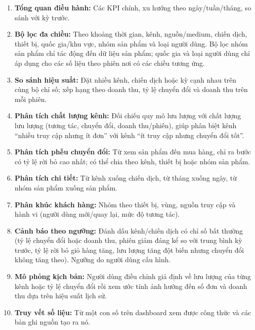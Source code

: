 \begin{enumerate}
    \item \textbf{Tổng quan điều hành:} Các KPI chính, xu hướng theo ngày/tuần/tháng, so sánh với kỳ trước.

    \item \textbf{Bộ lọc đa chiều:} Theo khoảng thời gian, kênh, nguồn/medium, chiến dịch, thiết bị, quốc gia/khu vực, nhóm sản phẩm và loại người dùng. Bộ lọc nhóm sản phẩm chỉ tác động đến dữ liệu sản phẩm; quốc gia và loại người dùng chỉ áp dụng cho các số liệu theo phiên nơi có các chiều tương ứng.

    \item \textbf{So sánh hiệu suất:} Đặt nhiều kênh, chiến dịch hoặc kỳ cạnh nhau trên cùng bộ chỉ số; xếp hạng theo doanh thu, tỷ lệ chuyển đổi và doanh thu trên mỗi phiên.

    \item \textbf{Phân tích chất lượng kênh:} Đối chiếu quy mô lưu lượng với chất lượng lưu lượng (tương tác, chuyển đổi, doanh thu/phiên), giúp phân biệt kênh ``nhiều truy cập nhưng ít đơn'' với kênh ``ít truy cập nhưng chuyển đổi tốt''.

    \item \textbf{Phân tích phễu chuyển đổi:} Từ xem sản phẩm đến mua hàng, chỉ ra bước có tỷ lệ rời bỏ cao nhất; có thể chia theo kênh, thiết bị hoặc nhóm sản phẩm.

    \item \textbf{Phân tích chi tiết:} Từ kênh xuống chiến dịch, từ tháng xuống ngày, từ nhóm sản phẩm xuống sản phẩm.

    \item \textbf{Phân khúc khách hàng:} Nhóm theo thiết bị, vùng, nguồn truy cập và hành vi (người dùng mới/quay lại, mức độ tương tác).

    \item \textbf{Cảnh báo theo ngưỡng:} Đánh dấu kênh/chiến dịch có chỉ số bất thường (tỷ lệ chuyển đổi hoặc doanh thu, phiên giảm đáng kể so với trung bình kỳ trước, tỷ lệ rời bỏ giỏ hàng tăng, lưu lượng tăng đột biến nhưng chuyển đổi không tăng theo). Ngưỡng do người dùng cấu hình.

    \item \textbf{Mô phỏng kịch bản:} Người dùng điều chỉnh giả định về lưu lượng của từng kênh hoặc tỷ lệ chuyển đổi rồi xem ước tính ảnh hưởng đến số đơn và doanh thu dựa trên hiệu suất lịch sử.

    \item \textbf{Truy vết số liệu:} Từ một con số trên dashboard xem được công thức và các bản ghi nguồn tạo ra nó.
\end{enumerate}

